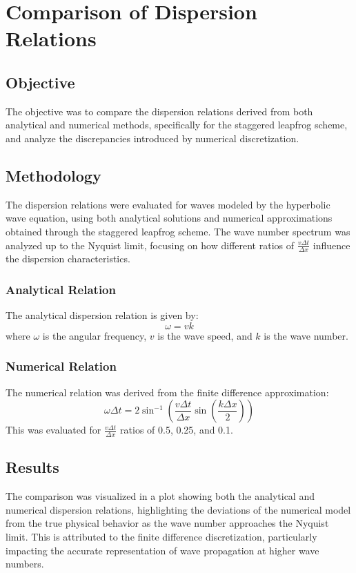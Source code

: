 \documentclass{article}
\begin{document}
\section{Comparison of Dispersion Relations}

\subsection{Objective}
The objective was to compare the dispersion relations derived from both analytical and numerical methods, specifically for the staggered leapfrog scheme, and analyze the discrepancies introduced by numerical discretization.

\subsection{Methodology}
The dispersion relations were evaluated for waves modeled by the hyperbolic wave equation, using both analytical solutions and numerical approximations obtained through the staggered leapfrog scheme. The wave number spectrum was analyzed up to the Nyquist limit, focusing on how different ratios of \( \frac{v\Delta t}{\Delta x} \) influence the dispersion characteristics.

\subsubsection{Analytical Relation}
The analytical dispersion relation is given by:
\[
\omega = v k
\]
where \( \omega \) is the angular frequency, \( v \) is the wave speed, and \( k \) is the wave number.

\subsubsection{Numerical Relation}
The numerical relation was derived from the finite difference approximation:
\[
\omega \Delta t = 2 \sin^{-1}\left(\frac{v\Delta t}{\Delta x} \sin\left(\frac{k\Delta x}{2}\right)\right)
\]
This was evaluated for \( \frac{v\Delta t}{\Delta x} \) ratios of 0.5, 0.25, and 0.1.

\subsection{Results}
The comparison was visualized in a plot showing both the analytical and numerical dispersion relations, highlighting the deviations of the numerical model from the true physical behavior as the wave number approaches the Nyquist limit. This is attributed to the finite difference discretization, particularly impacting the accurate representation of wave propagation at higher wave numbers.
\end{document}
